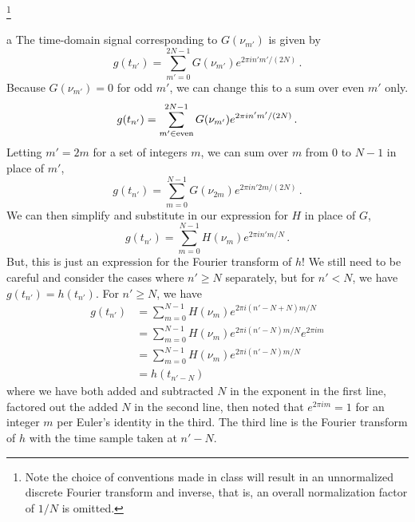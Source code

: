 \documentclass[]{homework}
\begin{document}

\begin{problem}{1}\footnote{
Note the choice of conventions made in class will result in
an unnormalized discrete Fourier transform and inverse, that is,
an overall normalization factor of $1/N$ is omitted.
} \,

  \begin{subproblem}{a}
    The time-domain signal corresponding to $G(\nu_{m'})$ is given by
    \[
      g(t_{n'}) = \sum_{m' = 0}^{2N-1} G(\nu_{m'}) e^{2\pi i n' m' / (2N)}\,.
    \]
    Because $G(\nu_{m'}) = 0$ for odd $m'$, we can change this to a sum over
    even $m'$ only.
    \[
      g(t_{n'}) = \sum_{m' \in {\rm even}}^{2N-1} G(\nu_{m'}) e^{2\pi i n' m' / (2N)}\,.
    \]
    Letting $m' = 2m$ for a set of integers $m$, we can sum over $m$ from $0$ to $N-1$
    in place of $m'$,
    \[
      g(t_{n'}) = \sum_{m = 0}^{N-1} G(\nu_{2m}) e^{2\pi i n' 2m / (2N)}\,.
    \]
    We can then simplify and substitute in our expression for $H$ in place of $G$,
    \[
      g(t_{n'}) = \sum_{m = 0}^{N-1} H(\nu_{m}) e^{2\pi i n' m / N}\,.
    \]
    But, this is just an expression for the Fourier transform of $h$!
    We still need to be careful and consider the cases where $n' \ge N$ separately,
    but for $n' < N$, we have $g(t_{n'}) = h(t_{n'})$.
    For $n' \ge N$, we have
    \begin{align}
      g(t_{n'}) &= \sum_{m = 0}^{N-1} H(\nu_{m}) e^{2\pi i (n' - N + N) m / N}\nonumber\\
                &= \sum_{m = 0}^{N-1} H(\nu_{m}) e^{2\pi i (n' - N) m / N} e^{2\pi i m}\nonumber\\
                &= \sum_{m = 0}^{N-1} H(\nu_{m}) e^{2\pi i (n' - N) m / N}\nonumber\\
                &= h(t_{n'-N}) \nonumber
    \end{align}
    where we have both added and subtracted $N$ in the exponent in the first line,
    factored out the added $N$ in the second line, then noted
    that $e^{2\pi i m} = 1$ for an integer $m$ per Euler's identity in the third.
    The third line is the Fourier transform of $h$ with the time sample
    taken at $n'-N$.

  \end{subproblem}


\end{problem}
\end{document}
